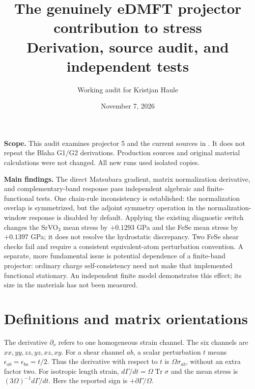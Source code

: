 \documentclass[11pt]{article}
\title{The genuinely eDMFT projector contribution to stress\\
\large Derivation, source audit, and independent tests}
\author{Working audit for Kristjan Haule}
\date{November 7, 2026}
\newcommand{\Tr}{\operatorname{Tr}}
\begin{document}
\maketitle
\textbf{Scope.} This audit examines projector 5 and the current sources in
. It does not repeat the
Blaha G1/G2 derivations. Production sources and original material calculations
were not changed. All new runs used isolated copies.

\textbf{Main findings.} The direct Matsubara gradient, matrix normalization
derivative, and complementary-band response pass independent algebraic and
finite-functional tests. One chain-rule inconsistency is established: the
normalization overlap is symmetrized, but the adjoint symmetry operation in
the normalization-window response is disabled by default. Applying the existing
diagnostic switch changes the SrVO$_3$ mean stress by $+0.1293$ GPa and the
FeSe mean stress by $+0.1397$ GPa; it
does not resolve the hydrostatic discrepancy. Two FeSe shear checks fail and
require a consistent equivalent-atom perturbation convention. A separate,
more fundamental issue is potential dependence of a finite-band projector:
ordinary charge self-consistency need not make that implemented functional
stationary. An independent finite model demonstrates this effect; its size in
the materials has not been measured.

\section{Definitions and matrix orientations}
The derivative $\partial_\nu$ refers to one homogeneous strain channel.
The six channels are $xx,yy,zz,yz,xz,xy$. For a shear channel $ab$, a scalar
perturbation $t$ means $\epsilon_{ab}=\epsilon_{ba}=t/2$. Thus the derivative
with respect to $t$ is $\Omega\sigma_{ab}$, without an extra factor two.
For isotropic length strain, $d\Gamma/dt=\Omega\Tr\sigma$ and the mean stress
is $(3\Omega)^{-1}d\Gamma/dt$. Here the reported sign is $+\partial\Gamma/\Omega$.
\end{document}
